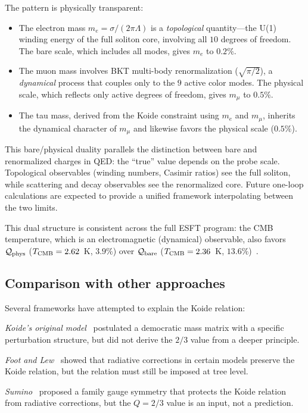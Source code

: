 ﻿\documentclass[twocolumn,preprintnumbers,amsmath,amssymb]{revtex4-2}
\newcommand{\Qoppa}{\mathcal{Q}}
\begin{document}
The pattern is physically transparent:
\begin{itemize}
\item The electron mass $m_e = \sigma/(2\pi\Lambda)$ is a \emph{topological} quantity---the U(1) winding energy of the full soliton core, involving all $10$ degrees of freedom. The bare scale, which includes all modes, gives $m_e$ to $0.2\%$.
\item The muon mass involves BKT multi-body renormalization ($\sqrt{\pi/2}$), a \emph{dynamical} process that couples only to the $9$ active color modes. The physical scale, which reflects only active degrees of freedom, gives $m_\mu$ to $0.5\%$.
\item The tau mass, derived from the Koide constraint using $m_e$ and $m_\mu$, inherits the dynamical character of $m_\mu$ and likewise favors the physical scale ($0.5\%$).
\end{itemize}

This bare/physical duality parallels the distinction between bare and renormalized charges in QED: the ``true'' value depends on the probe scale. Topological observables (winding numbers, Casimir ratios) see the full soliton, while scattering and decay observables see the renormalized core. Future one-loop calculations are expected to provide a unified framework interpolating between the two limits.

This dual structure is consistent across the full ESFT program: the CMB temperature, which is an electromagnetic (dynamical) observable, also favors $\Qoppa_{\rm phys}$ ($T_{\rm CMB} = 2.62$~K, $3.9\%$) over $\Qoppa_{\rm bare}$ ($T_{\rm CMB} = 2.36$~K, $13.6\%$)~\cite{Paper12}.

\subsection{Comparison with other approaches}

Several frameworks have attempted to explain the Koide relation:

\textit{Koide's original model}~\cite{Koide1983} postulated a democratic mass matrix with a specific perturbation structure, but did not derive the $2/3$ value from a deeper principle.

\textit{Foot and Lew}~\cite{Foot1994} showed that radiative corrections in certain models preserve the Koide relation, but the relation must still be imposed at tree level.

\textit{Sumino}~\cite{Sumino2009} proposed a family gauge symmetry that protects the Koide relation from radiative corrections, but the $Q = 2/3$ value is an input, not a prediction.
\end{document}
